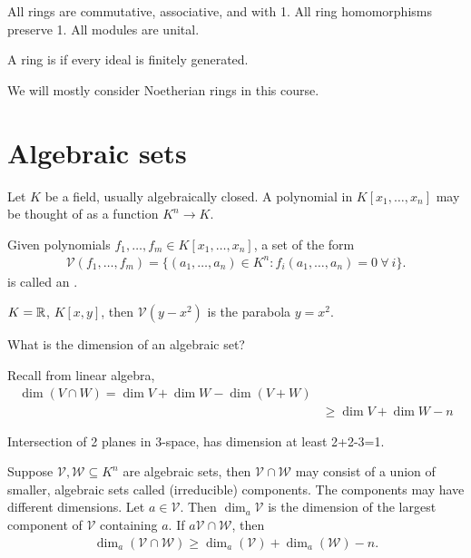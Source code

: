 \documentclass[12pt,class=article,crop=false]{standalone}
\begin{document}
All rings are commutative, associative, and with 1. All ring homomorphisms preserve 1. All modules are unital.


\begin{defn}
A ring is  if every ideal is finitely generated. 
\end{defn}
\begin{remark}
We will mostly consider Noetherian rings in this course.
\end{remark}

\section{Algebraic sets}
Let $ K$ be a field, usually algebraically closed. A polynomial in  $ K[x_1,\ldots,x_n]$ may be thought of as a function $ K^{n} \to K$.

\begin{defn}
	Given polynomials $ f_1,\ldots,f_m \in K[x_1,\ldots,x_n]$, a set of the form
	\begin{align*}
		\mathcal{ V}(f_1,\ldots,f_m) = \{(a_1,\ldots,a_n) \in K^{n}: f_i(a_1,\ldots,a_n) = 0 \ \forall \ i\} .
	\end{align*}
is called an .  
\end{defn}

\begin{eg}
	$ K = \mathbb{R}$, $ K[x,y]$, then  $ \mathcal{ V}(y-x^2)$ is the parabola $ y=x^2$.
\end{eg}

\begin{ques}
	What is the dimension of an algebraic set?
\end{ques}
Recall from linear algebra,
\begin{align*}
	\dim (V \cap W) = \dim  V + \dim  W - \dim (V+W)\\
	&\geq \dim V + \dim  W -n
\end{align*}
\begin{eg}
Intersection of 2 planes in 3-space, has dimension at least 2+2-3=1.
\end{eg}

\begin{remark}
Suppose $ \mathcal{ V}, \mathcal{ W} \subseteq K^{n}$ are algebraic sets, then $ \mathcal{ V} \cap \mathcal{ W}$ may consist of a union of smaller, algebraic sets called (irreducible) components. The components may have different dimensions. Let $ a \in \mathcal{ V}$. Then $ \dim _a \mathcal{ V}$ is the dimension of the largest component of $ \mathcal{ V}$ containing $ a$. If  $ a \mathcal{ V} \cap \mathcal{ W}$, then
\begin{align*}
	\dim _a( \mathcal{ V} \cap \mathcal{ W}) \geq \dim _a( \mathcal{ V})  + \dim _a ( \mathcal{ W}) - n.
\end{align*}
\end{remark}
\end{document}

